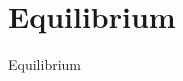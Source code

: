 %
%
%
%
%

\section{Equilibrium}

\begin{frame}

\begin{center}
{\LARGE Equilibrium}
\end{center}

\end{frame}



